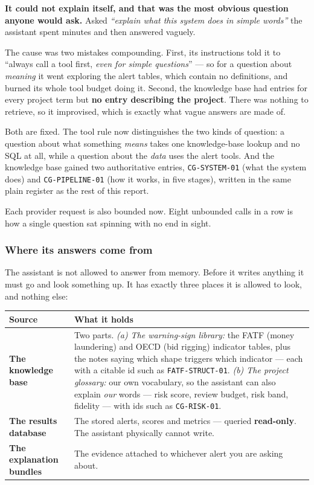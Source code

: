 \documentclass[11pt,a4paper]{article}
\newcommand{\code}[1]{\texttt{\small #1}}
\begin{document}
\begin{warnbox}
\textbf{It could not explain itself, and that was the most obvious question
anyone would ask.} Asked \emph{``explain what this system does in simple
words''} the assistant spent minutes and then answered vaguely.

The cause was two mistakes compounding. First, its instructions told it to
``always call a tool first, \emph{even for simple questions}'' --- so for a
question about \emph{meaning} it went exploring the alert tables, which contain
no definitions, and burned its whole tool budget doing it. Second, the knowledge
base had entries for every project term but \textbf{no entry describing the
project}. There was nothing to retrieve, so it improvised, which is exactly what
vague answers are made of.

Both are fixed. The tool rule now distinguishes the two kinds of question: a
question about what something \emph{means} takes one knowledge-base lookup and
no SQL at all, while a question about the \emph{data} uses the alert tools. And
the knowledge base gained two authoritative entries, \code{CG-SYSTEM-01} (what
the system does) and \code{CG-PIPELINE-01} (how it works, in five stages),
written in the same plain register as the rest of this report.

Each provider request is also bounded now. Eight unbounded calls in a row is how
a single question sat spinning with no end in sight.
\end{warnbox}

\subsubsection*{Where its answers come from}

The assistant is not allowed to answer from memory. Before it writes anything it
must go and look something up. It has exactly three places it is allowed to
look, and nothing else:

\begin{longtable}{@{}p{4.3cm}p{11.2cm}@{}}
\toprule
\textbf{Source} & \textbf{What it holds} \\
\midrule
\endhead
\textbf{The knowledge base} & Two parts. \emph{(a) The warning-sign library:} the
FATF (money laundering) and OECD (bid rigging) indicator tables, plus the notes
saying which shape triggers which indicator --- each with a citable id such as
\code{FATF-STRUCT-01}. \emph{(b) The project glossary:} our own vocabulary, so
the assistant can also explain \emph{our} words --- risk score, review budget,
risk band, fidelity --- with ids such as \code{CG-RISK-01}. \\
\textbf{The results database} & The stored alerts, scores and metrics ---
queried \textbf{read-only}. The assistant physically cannot write. \\
\textbf{The explanation bundles} & The evidence attached to whichever alert you
are asking about. \\
\bottomrule
\end{longtable}
\end{document}
